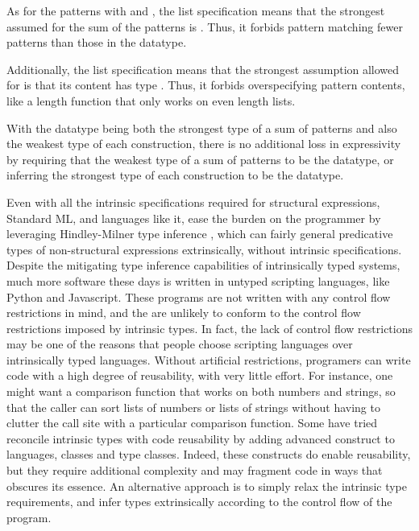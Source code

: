 \documentclass[table,dvipsnames,acmsmall]{acmart}
\theoremstyle{definition}
\begin{document}

\noindent
As for the patterns with  and , the list specification 
means that the strongest assumed for the sum of the patterns
is . 
Thus, it forbids pattern matching fewer patterns than those in the datatype.


\noindent
Additionally, the list specification 
means that the strongest assumption allowed for  is that its
content has type . Thus, 
it forbids overspecifying pattern contents,
like a length function that only works on even length lists.  


\noindent
With the datatype being both the strongest type of a sum of patterns and also the weakest
type of each construction, there is no additional loss in expressivity by
requiring that the weakest type of a sum of patterns to be the datatype, 
or inferring the strongest type of each construction to be the datatype.


Even with all the intrinsic specifications required for structural expressions, Standard ML,
and languages like it, ease the burden on the programmer by leveraging Hindley-Milner
type inference \cite{}, which can fairly general predicative types of 
non-structural expressions extrinsically, without intrinsic specifications. 
Despite the mitigating type inference capabilities of intrinsically typed systems, 
much more software these days is written
in untyped scripting languages, like Python and Javascript. 
These programs are not written with any control flow restrictions in mind,
and the are unlikely to conform to the control flow restrictions imposed by intrinsic types.
In fact, the lack of control flow restrictions may be one of the reasons that people
choose scripting languages over intrinsically typed languages.
Without artificial restrictions, programers can write code with a high degree of reusability,
with very little effort.
For instance, one might want a comparison function that works on both numbers and strings,
so that the caller can sort lists of numbers or lists of strings without having to
clutter the call site with a particular comparison function.  
Some have tried reconcile intrinsic types with code reusability by adding
advanced construct to languages, classes and type classes.
Indeed, these constructs do enable reusability, but they require additional
complexity and may fragment code in ways that obscures its essence.   
An alternative approach is to simply relax the intrinsic type requirements,
and infer types extrinsically according to the control flow of the program. 
\end{document}
